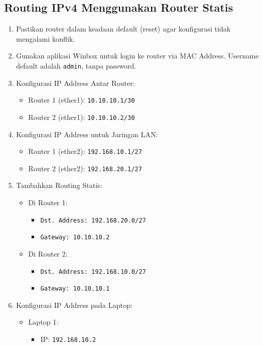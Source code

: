 \subsection{Routing IPv4 Menggunakan Router Statis}

\begin{enumerate}
  \item Pastikan router dalam keadaan default (reset) agar konfigurasi tidak mengalami konflik.
  \item Gunakan aplikasi Winbox untuk login ke router via MAC Address. Username default adalah \texttt{admin}, tanpa password.
  \item {Konfigurasi IP Address Antar Router:}
  \begin{itemize}
    \item Router 1 (ether1): \texttt{10.10.10.1/30}
    \item Router 2 (ether1): \texttt{10.10.10.2/30}
  \end{itemize}
  \item {Konfigurasi IP Address untuk Jaringan LAN:}
  \begin{itemize}
    \item Router 1 (ether2): \texttt{192.168.10.1/27}
    \item Router 2 (ether2): \texttt{192.168.20.1/27}
  \end{itemize}
  \item {Tambahkan Routing Statis:}
  \begin{itemize}
    \item Di Router 1:
    \begin{itemize}
      \item \texttt{Dst. Address: 192.168.20.0/27}
      \item \texttt{Gateway: 10.10.10.2}
    \end{itemize}
    \item Di Router 2:
    \begin{itemize}
      \item \texttt{Dst. Address: 192.168.10.0/27}
      \item \texttt{Gateway: 10.10.10.1}
    \end{itemize}
  \end{itemize}
  \item {Konfigurasi IP Address pada Laptop:}
  \begin{itemize}
    \item Laptop 1:
    \begin{itemize}
      \item IP: \texttt{192.168.10.2}

\end{itemize}
\end{itemize}
\end{enumerate}
